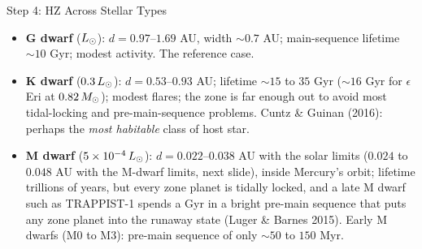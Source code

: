 \documentclass[aspectratio=169, 11pt]{beamer}
\begin{document}
\begin{frame}{Step 4: HZ Across Stellar Types}
  \begin{itemize}\setlength\itemsep{4pt}
    \item \textbf{G dwarf} ($L_{\odot}$): $d = 0.97$--$1.69$ AU, width $\sim 0.7$ AU; main-sequence lifetime $\sim 10$ Gyr; modest activity. The reference case.
    \item \textbf{K dwarf} ($0.3\,L_{\odot}$): $d = 0.53$--$0.93$ AU; lifetime $\sim 15$ to $35$ Gyr ($\sim 16$ Gyr for $\epsilon$ Eri at $0.82\,M_{\odot}$); modest flares; the zone is far enough out to avoid most tidal-locking and pre-main-sequence problems. Cuntz \& Guinan (2016): perhaps the \emph{most habitable} class of host star.
    \item \textbf{M dwarf} ($5\times 10^{-4}\,L_{\odot}$): $d = 0.022$--$0.038$ AU with the solar limits ($0.024$ to $0.048$ AU with the M-dwarf limits, next slide), inside Mercury's orbit; lifetime trillions of years, but every zone planet is tidally locked, and a late M dwarf such as TRAPPIST-1 spends a Gyr in a bright pre-main sequence that puts any zone planet into the runaway state (Luger \& Barnes 2015). Early M dwarfs (M0 to M3): pre-main sequence of only $\sim 50$ to $150$ Myr.
  \end{itemize}
\end{frame}
\end{document}
